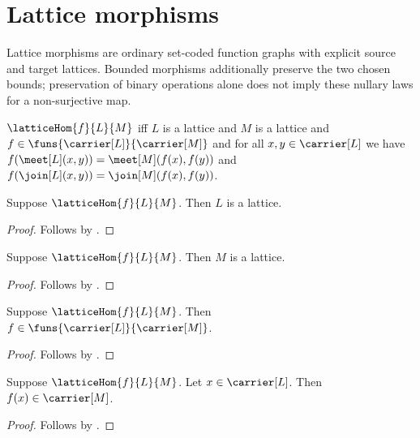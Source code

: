 \section{Lattice morphisms}




Lattice morphisms are ordinary set-coded function graphs with explicit source
and target lattices.  Bounded morphisms additionally preserve the two chosen
bounds; preservation of binary operations alone does not imply these nullary
laws for a non-surjective map.

\begin{definition}\label{lattice_hom}
    $\latticeHom{f}{L}{M}$ iff
        $L$ is a lattice and $M$ is a lattice and
        $f\in\funs{\carrier[L]}{\carrier[M]}$ and
        for all $x,y\in\carrier[L]$ we have
            $f(\meet[L](x,y))=\meet[M](f(x),f(y))$ and
            $f(\join[L](x,y))=\join[M](f(x),f(y))$.
\end{definition}

\begin{proposition}\label{lattice_hom_source_lattice}
    Suppose $\latticeHom{f}{L}{M}$.
    Then $L$ is a lattice.
\end{proposition}
\begin{proof}
    Follows by .
\end{proof}

\begin{proposition}\label{lattice_hom_target_lattice}
    Suppose $\latticeHom{f}{L}{M}$.
    Then $M$ is a lattice.
\end{proposition}
\begin{proof}
    Follows by .
\end{proof}

\begin{proposition}\label{lattice_hom_type}
    Suppose $\latticeHom{f}{L}{M}$.
    Then $f\in\funs{\carrier[L]}{\carrier[M]}$.
\end{proposition}
\begin{proof}
    Follows by .
\end{proof}

\begin{proposition}\label{lattice_hom_apply_type}
    Suppose $\latticeHom{f}{L}{M}$.
    Let $x\in\carrier[L]$.
    Then $f(x)\in\carrier[M]$.
\end{proposition}
\begin{proof}
    Follows by .
\end{proof}

